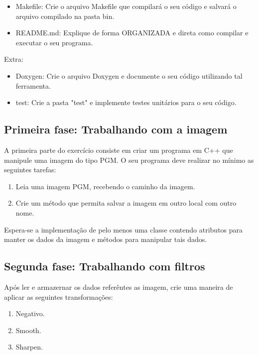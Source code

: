 \documentclass[a4paper,10pt]{article}
\begin{document}
\begin{itemize}
  \item Makefile: Crie o arquivo Makefile que compilará o seu código e
    salvará o arquivo compilado na pasta bin.
  \item README.md: Explique de forma ORGANIZADA e direta como compilar e
    executar o seu programa.
\end{itemize}

Extra:

\begin{itemize}
  \item Doxygen: Crie o arquivo Doxygen e documente o seu código utilizando
    tal ferramenta.
  \item test: Crie a pasta "test" e implemente testes unitários para o seu
    código.
\end{itemize}

\subsection{Primeira fase: Trabalhando com a imagem}

A primeira parte do exercício consiste em criar um programa em C++ que
manipule uma imagem do tipo PGM. O seu programa deve realizar no mínimo as
seguintes tarefas:

\begin{enumerate}
  \item Leia uma imagem PGM, recebendo o caminho da imagem.
  \item Crie um método que permita salvar a imagem em outro local com outro
    nome.
\end{enumerate}

Espera-se a implementação de pelo menos uma classe contendo atributos para
manter os dados da imagem e métodos para manipular tais dados.

\subsection{Segunda fase: Trabalhando com filtros}

Após ler e armazernar os dados referêntes as imagem, crie uma maneira de 
aplicar as seguintes transformações:

\begin{enumerate}
  \item Negativo.
  \item Smooth.
  \item Sharpen.
\end{enumerate}
\end{document}
